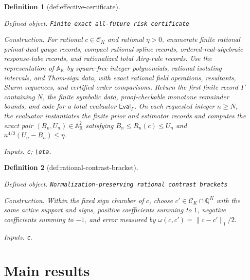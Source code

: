 \documentclass{article}
\newtheorem{definition}{Definition}
\begin{document}
\begin{definition}[def:effective-certificate]\label{def:effective-certificate}
\par\smallskip\noindent\emph{Defined object.} \texttt{Finite exact all-\allowbreak{}future risk certificate}
\par\smallskip\noindent\emph{Construction.} For rational \(c\in\mathcal C_K\) and rational \(\eta>0\), enumerate finite rational primal-dual gauge records, compact rational spline records, ordered-real-algebraic response-tube records, and rationalized total Airy-rule records. Use the representation of \(\mathbb A_{\mathrm R}\) by square-free integer polynomials, rational isolating intervals, and Thom-sign data, with exact rational field operations, resultants, Sturm sequences, and certified order comparisons. Return the first finite record \(\Gamma\) containing \(N\), the finite symbolic data, proof-checkable monotone remainder bounds, and code for a total evaluator \(\mathsf{Eval}_{\Gamma}\). On each requested integer \(n\ge N\), the evaluator instantiates the finite prior and estimator records and computes the exact pair \((B_n,U_n)\in\mathbb A_{\mathrm R}^2\) satisfying \(B_n\le R_n(c)\le U_n\) and \(n^{4/3}(U_n-B_n)\le\eta\).
\par\smallskip\noindent\emph{Inputs.} \texttt{c}; \texttt{\textbackslash{}\allowbreak{}eta}.
\end{definition}

\begin{definition}[def:rational-contrast-bracket]\label{def:rational-contrast-bracket}
\par\smallskip\noindent\emph{Defined object.} \texttt{Normalization-\allowbreak{}preserving rational contrast brackets}
\par\smallskip\noindent\emph{Construction.} Within the fixed sign chamber of \(c\), choose \(c'\in\mathcal C_K\cap\mathbb Q^K\) with the same active support and signs, positive coefficients summing to \(1\), negative coefficients summing to \(-1\), and error measured by \(\omega(c,c')=\|c-c'\|_1/2\).
\par\smallskip\noindent\emph{Inputs.} \texttt{c}.
\end{definition}

\section{Main results}
\end{document}
